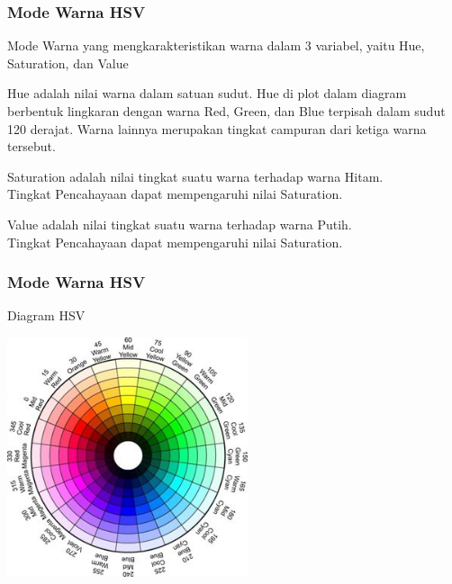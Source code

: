 \documentclass[table,dvipsnames]{beamer}
\begin{document}
\begin{frame}
\frametitle{Mode Warna HSV}
\begin{block}{}
Mode Warna yang mengkarakteristikan warna dalam 3 variabel, yaitu Hue, Saturation, dan Value
\end{block}
\begin{block}{}
Hue adalah nilai warna dalam satuan sudut.
Hue di plot dalam diagram berbentuk lingkaran dengan warna Red, Green, dan Blue terpisah dalam sudut 120 derajat.
Warna lainnya merupakan tingkat campuran dari ketiga warna tersebut.
\end{block}
\begin{block}{}
Saturation adalah nilai tingkat suatu warna terhadap warna Hitam.\\
Tingkat Pencahayaan dapat mempengaruhi nilai Saturation.
\end{block}
\begin{block}{}
Value adalah nilai tingkat suatu warna terhadap warna Putih.\\
Tingkat Pencahayaan dapat mempengaruhi nilai Saturation.
\end{block}
\end{frame}

\begin{frame}
\frametitle{Mode Warna HSV}
\begin{block}{Diagram HSV}
\begin{center}
 \includegraphics[width=200pt]{./tinjauan_teori/hsv/HSV}
\end{center}
\end{block}
\end{frame}
\end{document}
